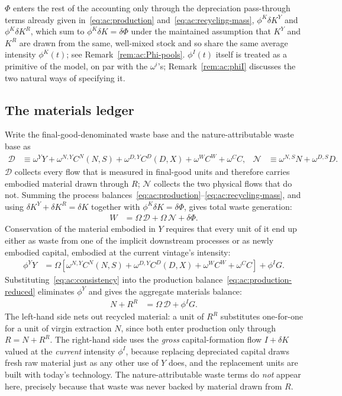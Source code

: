 $\Phi$ enters the rest of the accounting only through the depreciation pass-through terms already given in~\eqref{eq:ac:production} and~\eqref{eq:ac:recycling-mass}, $\phi^K\delta K^Y$ and $\phi^K\delta K^R$, which sum to $\phi^K\delta K=\delta\Phi$ under the maintained assumption that $K^Y$ and $K^R$ are drawn from the same, well-mixed stock and so share the same average intensity $\phi^K(t)$; see Remark~\ref{rem:ac:Phi-pools}. $\phi^I(t)$ itself is treated as a primitive of the model, on par with the $\omega^i$'s; Remark~\ref{rem:ac:phiI} discusses the two natural ways of specifying it.

\subsection{The materials ledger}
\label{subsec:ac:balances}

 Write the final-good-denominated waste base and the nature-attributable waste base as
\begin{align}
\mathcal D &\equiv \omega^YY+\omega^{N,Y}C^N(N,S)+\omega^{D,Y}C^D(D,X)+\omega^WC^W+\omega^CC,
&
\mathcal N &\equiv \omega^{N,S}N+\omega^{D,S}D.
\label{eq:ac:base}
\end{align}
$\mathcal D$ collects every flow that is measured in final-good units and therefore carries embodied material drawn through $R$; $\mathcal N$ collects the two physical flows that do not. Summing the process balances~\eqref{eq:ac:production}--\eqref{eq:ac:recycling-mass}, and using $\delta K^Y+\delta K^R=\delta K$ together with $\phi^K\delta K=\delta\Phi$, gives total waste generation:
\begin{align}
W &= \Omega\,\mathcal D+\Omega\,\mathcal N+\delta\Phi.
\label{eq:ac:waste-generation}
\end{align}
Conservation of the material embodied in $Y$ requires that every unit of it end up either as waste from one of the implicit downstream processes or as newly embodied capital, embodied at the current vintage's intensity:
\begin{align}
\phi^YY &= \Omega\left[\omega^{N,Y}C^N(N,S)+\omega^{D,Y}C^D(D,X)+\omega^WC^W+\omega^CC\right]+\phi^IG.
\label{eq:ac:consistency}
\end{align}
Substituting~\eqref{eq:ac:consistency} into the production balance~\eqref{eq:ac:production-reduced} eliminates $\phi^Y$ and gives the aggregate materials balance:
\begin{align}
N+R^R &= \Omega\,\mathcal D+\phi^IG.
\label{eq:ac:materials-balance}
\end{align}
The left-hand side nets out recycled material: a unit of $R^R$ substitutes one-for-one for a unit of virgin extraction $N$, since both enter production only through $R=N+R^R$. The right-hand side uses the \emph{gross} capital-formation flow $I+\delta K$ valued at the \emph{current} intensity $\phi^I$, because replacing depreciated capital draws fresh raw material just as any other use of $Y$ does, and the replacement units are built with today's technology. The nature-attributable waste terms do \emph{not} appear here, precisely because that waste was never backed by material drawn from $R$.


